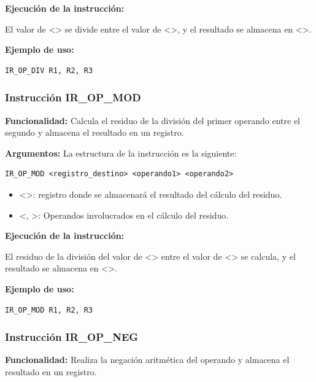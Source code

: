\noindent
\textbf{Ejecución de la instrucción:}
\vspace{0.3cm}

\noindent
El valor de <> se divide entre el valor de <>, y el resultado se almacena en <>.
\vspace{0.3cm}

\noindent
\textbf{Ejemplo de uso:}
\begin{verbatim}
IR_OP_DIV R1, R2, R3
\end{verbatim}

\subsubsection{Instrucción IR\_OP\_MOD}\label{subsubsec:IR_OP_MOD}
\noindent
\textbf{Funcionalidad:} Calcula el residuo de la división del primer operando entre el segundo y almacena el resultado en un registro.

\noindent
\textbf{Argumentos:} La estructura de la instrucción es la siguiente:
\begin{verbatim}
IR_OP_MOD <registro_destino> <operando1> <operando2>
\end{verbatim}
\begin{itemize}
    \item <>: registro donde se almacenará el resultado del cálculo del residuo.
    \item <, >: Operandos involucrados en el cálculo del residuo.
\end{itemize}

\noindent
\textbf{Ejecución de la instrucción:}
\vspace{0.3cm}

\noindent
El residuo de la división del valor de <> entre el valor de <> se calcula, y el resultado se almacena en <>.
\vspace{0.3cm}

\noindent
\textbf{Ejemplo de uso:}
\begin{verbatim}
IR_OP_MOD R1, R2, R3
\end{verbatim}

\subsubsection{Instrucción IR\_OP\_NEG}\label{subsubsec:IR_OP_NEG}
\noindent
\textbf{Funcionalidad:} Realiza la negación aritmética del operando y almacena el resultado en un registro.

